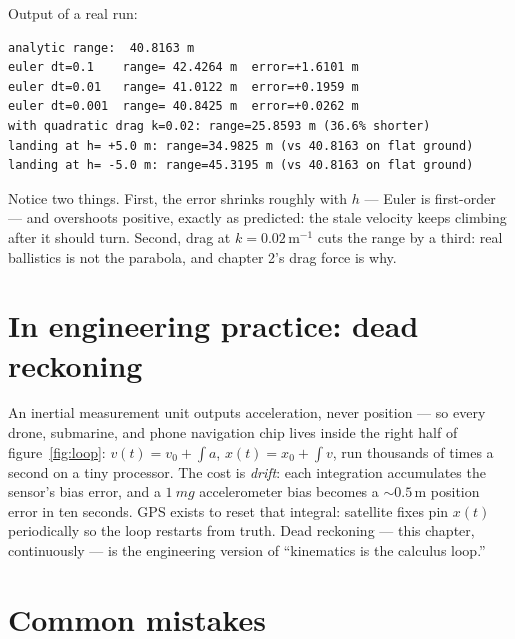 Output of a real run:
\begin{lstlisting}[numbers=none]
analytic range:  40.8163 m
euler dt=0.1    range= 42.4264 m  error=+1.6101 m
euler dt=0.01   range= 41.0122 m  error=+0.1959 m
euler dt=0.001  range= 40.8425 m  error=+0.0262 m
with quadratic drag k=0.02: range=25.8593 m (36.6% shorter)
landing at h= +5.0 m: range=34.9825 m (vs 40.8163 on flat ground)
landing at h= -5.0 m: range=45.3195 m (vs 40.8163 on flat ground)
\end{lstlisting}

Notice two things. First, the error shrinks roughly with $h$ --- Euler is
first-order --- and overshoots positive, exactly as predicted: the stale
velocity keeps climbing after it should turn. Second, drag at
$k=0.02\,\mathrm{m^{-1}}$ cuts the range by a third: real ballistics is not
the parabola, and chapter 2's drag force is why.

\section{In engineering practice: dead reckoning}\label{sec:kin-eng}

An inertial measurement unit outputs acceleration, never position --- so
every drone, submarine, and phone navigation chip lives inside the right
half of figure~\ref{fig:loop}: $v(t)=v_0+\int a$, $x(t)=x_0+\int v$, run
thousands of times a second on a tiny processor. The cost is
\emph{drift}: each integration accumulates the sensor's
bias error, and a $\qty{1}{mg}$ accelerometer bias becomes a
$\sim 0.5\,\mathrm{m}$ position error in ten seconds. GPS exists to reset
that integral: satellite fixes pin $x(t)$ periodically so the loop restarts
from truth. Dead reckoning --- this chapter, continuously --- is the
engineering version of ``kinematics is the calculus loop.''

\section{Common mistakes}\label{sec:kin-mistakes}

